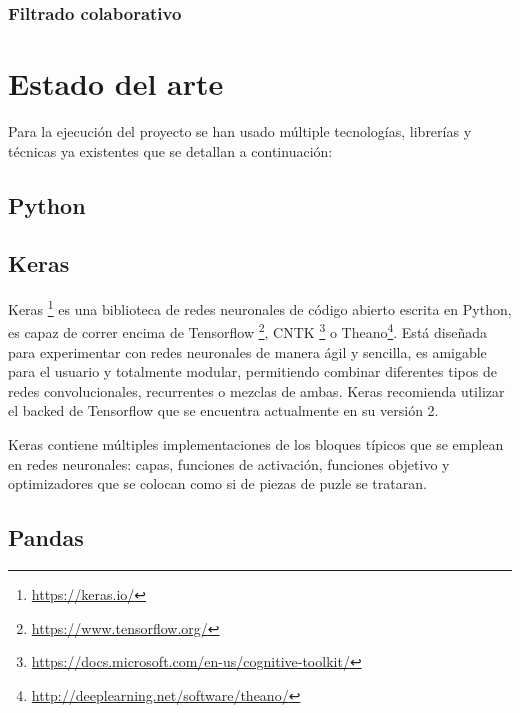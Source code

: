 \documentclass[a4paper, 12pt]{book}
\begin{document}
\subsection{Filtrado colaborativo}
\label{sec:filtrado_colaborativo}


\cleardoublepage
\chapter{Estado del arte}
\label{chap:estado}

Para la ejecución del proyecto se han usado múltiple tecnologías, librerías y técnicas ya existentes que se detallan a continuación:

\section{Python} 
\label{sec:python}

\section{Keras} 
\label{sec:keras}
Keras \footnote{\url{https://keras.io/}} es una biblioteca de redes neuronales de código abierto escrita en Python, es capaz de correr encima de Tensorflow \footnote{\url{https://www.tensorflow.org/}}, CNTK \footnote{\url{https://docs.microsoft.com/en-us/cognitive-toolkit/}} o Theano\footnote{\url{http://deeplearning.net/software/theano/}}. Está diseñada para experimentar con redes neuronales de manera ágil y sencilla, es amigable para el usuario y totalmente modular, permitiendo combinar diferentes tipos de redes  convolucionales, recurrentes o mezclas de ambas. Keras recomienda utilizar el backed de Tensorflow que se encuentra actualmente en su versión 2.

Keras contiene múltiples implementaciones de los bloques típicos que se emplean en redes neuronales: capas, funciones de activación, funciones objetivo y optimizadores que se colocan como si de piezas de puzle se trataran.

\section{Pandas} 
\label{sec:pandas}
\end{document}

